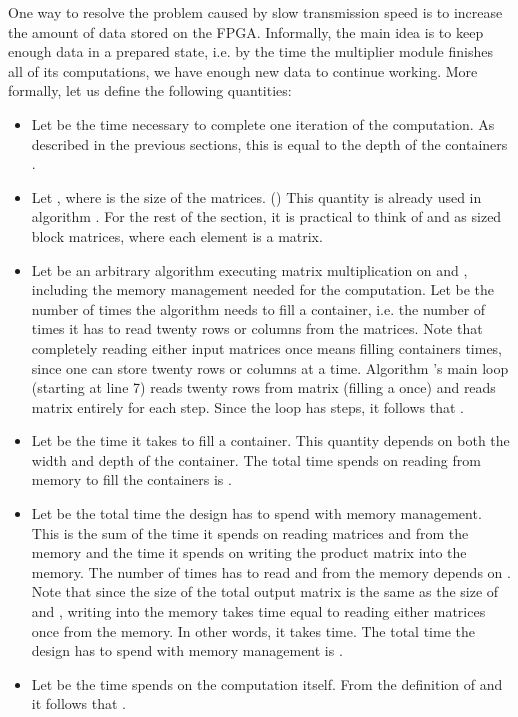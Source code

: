 \documentclass[11pt,twoside]{article}
\begin{document}
One way to resolve the problem caused by slow transmission speed is to increase the amount of data stored on the FPGA. Informally, the main idea is to keep enough data in a prepared state, i.e. by the time the multiplier module finishes all of its computations, we have enough new data to continue working. More formally, let us define the following quantities:
\begin{itemize}
\item Let  be the time necessary to complete one iteration of the computation. As described in the previous sections, this is equal to the depth of the containers .
\item Let , where  is the size of the matrices. () This quantity is already used in algorithm . For the rest of the section, it is practical to think of  and  as  sized block matrices, where each element is a  matrix.
\item Let  be an arbitrary algorithm executing matrix multiplication on  and , including the memory management needed for the computation. Let  be the number of times the algorithm needs to fill a  container, i.e. the number of times it has to read twenty rows or columns from the matrices. Note that completely reading either input matrices once means filling  containers  times, since one  can store twenty rows or columns at a time. Algorithm 's main loop (starting at line 7) reads twenty rows from matrix  (filling a  once) and reads matrix  entirely for each step. Since the loop has  steps, it follows that .
\item Let  be the time it takes to fill a  container. This quantity depends on both the width and depth of the container. The total time  spends on reading from memory to fill the containers is .
\item Let  be the total time the design has to spend with memory management. This is the sum of the time it spends on reading matrices  and  from the memory and the time it spends on writing the product matrix  into the memory. The number of times  has to read  and  from the memory depends on . Note that since the size of the total output matrix  is the same as the size of  and , writing  into the memory takes time equal to reading either matrices once from the memory. In other words, it takes  time. The total time the design has to spend with memory management is .
\item Let  be the time  spends on the computation itself. From the definition of  and  it follows that .
\end{itemize}
\end{document}
